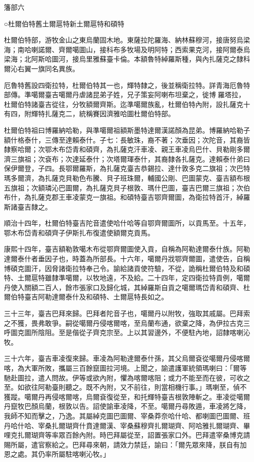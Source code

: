 
\begin{pinyinscope}
籓部六

○杜爾伯特舊土爾扈特新土爾扈特和碩特

杜爾伯特部，游牧金山之東烏蘭固木地。東薩拉陀羅海、納林蘇穆河，接唐努烏梁海；南哈喇諾爾、齊爾噶圖山，接科布多牧場及明阿特；西索果克河，接阿爾泰烏梁海；北阿斯哈圖河，接烏里雅蘇臺卡倫。本額魯特綽羅斯種，與內扎薩克之隸科爾沁右翼一旗同名異族。

厄魯特舊設四衛拉特，杜爾伯特其一也，輝特隸之，後並稱衛拉特。詳青海厄魯特部傳。準噶爾臺吉噶爾丹虐諸昆弟子姓，兄子策妄阿喇布坦棄之，徙博羅塔拉，杜爾伯特諸臺吉從往，分牧額爾齊斯。迄準噶爾族亂，杜爾伯特內附，設扎薩克十有四，附輝特扎薩克二，統稱賽因濟雅哈圖杜爾伯特部。

杜爾伯特祖曰博羅納哈勒，與準噶爾祖額斯墨特達爾漢諾顏為昆弟。博羅納哈勒子額什格泰什，三傳至達賴泰什。子七：長敏珠，裔不著；次垂因；次陀音，其裔皆隸察哈爾；次鄂木布岱青和碩齊，為扎薩克汗車凌、親王車凌烏巴什、貝勒剛多爾濟三旗祖；次袞布；次達延泰什；次塔爾琿泰什，其裔隸各扎薩克。達賴泰什弟曰保伊爾登，子四。長鄂爾羅斯，為扎薩克臺吉恭錫拉、達什敦多克二旗祖；次巴特瑪多爾濟，為扎薩克貝勒色布騰、貝子班珠爾，輔國公剛、巴圖蒙克、臺吉額布根五旗祖；次額璘沁巴圖爾，為扎薩克貝子根敦、瑪什巴圖，臺吉巴爾三旗祖；次伯布什，為扎薩克郡王車凌蒙克一旗祖。和碩特臺吉鄂齊爾圖，為衛拉特首汗，綽羅斯諸臺吉隸之。

順治十四年，杜爾伯特臺吉陀音遣使哈什哈等自鄂齊爾圖所，以貢馬至。十五年，鄂木布岱青和碩齊子伊斯扎布復遣使額爾克貢馬。

康熙十四年，臺吉額勒敦噶木布從鄂齊爾圖使入貢，自稱為阿勒達爾泰什族。阿勒達爾泰什者垂因子也，時蓋為所部長。十六年，噶爾丹戕鄂齊爾圖，遣使告，自稱博碩克圖汗，因脅諸衛拉特奉己令。諭給諸貢使符驗，不從，詭稱杜爾伯特及和碩特、土爾扈特雖隸準噶爾，以牧地遠，不及給。二十四年，定四衛拉特貢例，噶爾丹使入關額二百人，餘市張家口及歸化城，其綽羅斯自貢之噶爾瑪岱青和碩齊、杜爾伯特臺吉阿勒達爾泰什及和碩特、土爾扈特長如之。

三十三年，臺吉巴拜來歸。巴拜者陀音子也，噶爾丹以附牧，強取其戚屬。巴拜索之不獲，畏弗敢爭。嗣從噶爾丹侵喀爾喀，至烏蘭布通，欲棄之降，為伊拉古克三呼圖克圖所陰阻。至是偕從子齊克宗至。上以其習邊外，不便駐內地，詔隸喀喇沁牧。

三十六年，臺吉車凌復來歸。車凌為阿勒達爾泰什孫，其父烏爾袞從噶爾丹侵喀爾喀，為大軍所敗，攜屬三百餘竄圖拉河境。上聞之，諭遣護軍統領瑪喇曰：「爾等馳赴圖拉，遣人問故。伊等或欲內附，懼為喀爾喀阻；或力不能至而在彼，可收之至。如欲往阿勒臺則聽之。既不內附，又不前往，則當相機行事。」瑪喇至，偵不獲蹤。噶爾丹再侵喀爾喀，烏爾袞復從至，和托輝特臺吉根敦陣斬之。車凌從噶爾丹竄牧巴顏烏蘭，根敦以告。詔使諭車凌降，不至。噶爾丹尋敗遁，車凌將乞降，我師不知而擊之，乃逸。其屬綽克圖巴圖爾、宰桑莽奈哈什哈、都喇圖巴圖爾、班丹哈什哈、宰桑扎爾瑚齊什賁達爾漢、宰桑蘇穆齊扎爾瑚齊、阿哈雅扎爾瑚齊、畢哩克扎爾瑚齊等率眾百餘內附。時巴拜屬從至，詔置張家口外。巴拜遣宰桑博克請賜所屬，遣官察給之。巴拜尋來朝，請效力禁廷，諭曰：「爾先眾來降，朕自有加恩之處。其仍率所屬駐喀喇沁牧。」


\end{pinyinscope}
